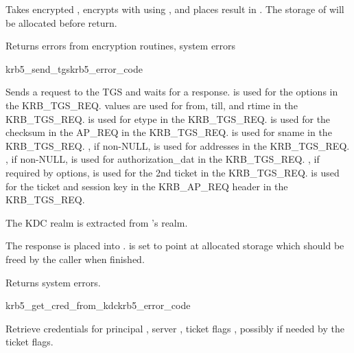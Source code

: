 Takes encrypted , encrypts with
using , and places result in
.  The storage of
 will be allocated before return.

Returns errors from encryption routines, system errors

\begin{funcdecl}{krb5_send_tgs}{krb5_error_code}{\funcin}
\funcinout
{}
\funcout
{}
\end{funcdecl}

Sends a request to the TGS and waits for a response.
 is used for the options in the KRB_TGS_REQ.
 values are used for from, till, and rtime in the
KRB_TGS_REQ.
 is used for etype in the KRB_TGS_REQ.
 is used for the checksum in the AP_REQ in the KRB_TGS_REQ.
 is used for sname in the KRB_TGS_REQ.
, if non-NULL, is used for addresses in the KRB_TGS_REQ.
, if non-NULL, is used for authorization_dat in the KRB_TGS_REQ.
, if required by options, is used for the 2nd
ticket in the KRB_TGS_REQ.
 is used for the ticket and session key in the KRB_AP_REQ header in the KRB_TGS_REQ.

The KDC realm is extracted from 's realm.

The response is placed into .
 is set to point at allocated storage
which should be freed by the caller when finished.

Returns system errors.

\begin{funcdecl}{krb5_get_cred_from_kdc}{krb5_error_code}{\funcin}
\funcinout
{}
\funcout			
{}
\end{funcdecl}

Retrieve credentials for principal ,
server ,
ticket flags , possibly
 if needed by the ticket flags.

